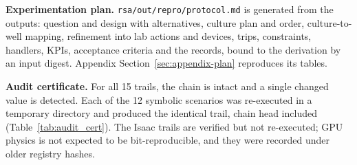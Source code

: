 \documentclass[10pt,a4paper]{article}
\begin{document}
\textbf{Experimentation plan.} \texttt{rsa/out/repro/protocol.md} is generated from the outputs: question and design with alternatives, culture plan and order, culture-to-well mapping, refinement into lab actions and devices, trips, constraints, handlers, KPIs, acceptance criteria and the records, bound to the derivation by an input digest. Appendix Section~\ref{sec:appendix-plan} reproduces its tables.

\textbf{Audit certificate.} For all 15 trails, the chain is intact and a single changed value is detected. Each of the 12 symbolic scenarios was re-executed in a temporary directory and produced the identical trail, chain head included (Table~\ref{tab:audit_cert}). The Isaac trails are verified but not re-executed; GPU physics is not expected to be bit-reproducible, and they were recorded under older registry hashes.
\end{document}
